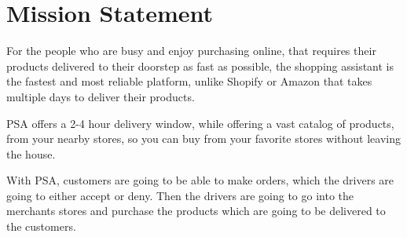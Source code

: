 \section{Mission Statement}
For the people who are busy and enjoy purchasing online, that requires their 
products delivered to their doorstep as fast as possible, the shopping 
assistant is the fastest and most reliable platform, unlike Shopify or 
Amazon that takes multiple days to deliver their products. \newline

\noindent PSA offers a 2-4 hour delivery window, while offering a vast 
catalog of products, from your nearby stores, so you can buy from your 
favorite stores without leaving the house. \newline

\noindent With PSA, customers are going to be able to make orders, which the 
drivers are going to either accept or deny. Then the drivers are going to go 
into the merchants stores and purchase the products which are going to 
be delivered to the customers.